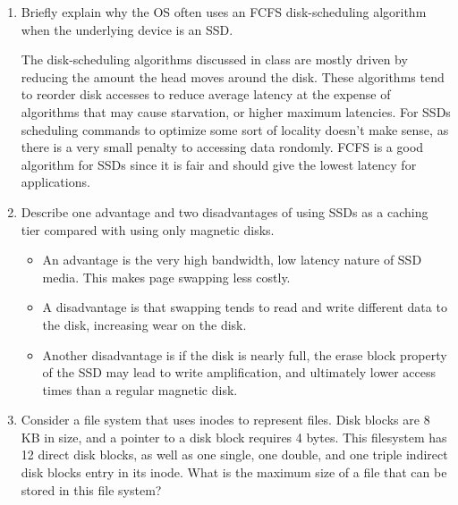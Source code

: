 \documentclass[a4paper, 11pt]{exam}
\begin{document}
\begin{enumerate}
\item Briefly explain why the OS often uses an FCFS disk-scheduling
  algorithm when the underlying device is an SSD.

  The disk-scheduling algorithms discussed in class are mostly driven
  by reducing the amount the head moves around the disk. These
  algorithms tend to reorder disk accesses to reduce average latency
  at the expense of algorithms that may cause starvation, or higher
  maximum latencies. For SSDs scheduling commands to optimize some
  sort of locality doesn't make sense, as there is a very small
  penalty to accessing data rondomly. FCFS is a good algorithm for
  SSDs since it is fair and should give the lowest latency for
  applications.

\item Describe one advantage and two disadvantages of using SSDs as a
  caching tier compared with using only magnetic disks.

\begin{itemize}
\item An advantage is the very high bandwidth, low latency nature of
  SSD media. This makes page swapping less costly.
\item A disadvantage is that swapping tends to read and write
  different data to the disk, increasing wear on the disk.
\item Another disadvantage is if the disk is nearly full, the erase
  block property of the SSD may lead to write amplification, and
  ultimately lower access times than a regular magnetic disk.
\end{itemize}
\item Consider a file system that uses inodes to represent files. Disk
  blocks are 8 KB in size, and a pointer to a disk block requires 4
  bytes. This filesystem has 12 direct disk blocks, as well as one
  single, one double, and one triple indirect disk blocks entry in its
  inode. What is the maximum size of a file that can be stored in this
  file system?




\end{enumerate}
\end{document}
